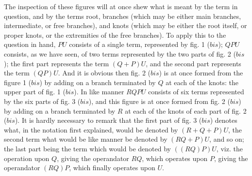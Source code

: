 \documentclass[12pt,a4paper]{article}
\theoremstyle{definition}
\begin{document}
\medskip

The inspection of these figures will at once shew what is meant by the term in
question, and by the terms root, branches (which may be either main branches, intermediate,
or free branches), and knots (which may be either the root itself,
or proper knots, or the extremities of the free branches). To apply this to the
question in hand, $PU$ consists of a single term, represented by fig. 1 ($bis$); $QPU$
consists, as we have seen, of two terms represented by the two parts of fig. 2 ($bis$); the
first part represents the term $(Q + P)U$, and the second part represents the term
$(QP)U$. And it is obvious then fig. 2 ($bis$) is at once formed from the figure 1
($bis$) by adding on a branch terminated by $Q$ at each of the knots: the upper part
of fig. 1 ($bis$). In like manner $RQPU$ consists of six terms represented by the six
parts of fig. 3 ($bis$), and this figure is at once formed from fig. 2 ($bis$) by adding
on a branch terminated by $R$ at each of the knots of each part of fig. 2 ($bis$). It is
hardly necessary to remark that the first part of fig. 3 ($bis$) denotes what, in the
notation first explained, would be denoted by $(R + Q + P)U$, the second term what
would be like manner be denoted by $(RQ + P)U$, and so on; the last part being the
term which would be denoted by $((RQ)P)U$, viz. the operation upon $Q$, giving the
operandator $RQ$, which operates upon $P$, giving the operandator $(RQ)P$, which finally
operates upon $U$.

\medskip
\end{document}
